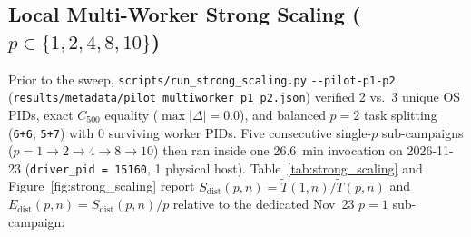 \documentclass[11pt,a4paper]{article}
\begin{document}
\subsection{Local Multi-Worker Strong Scaling (\texorpdfstring{$p \in \{1, 2, 4, 8, 10\}$}{p in {1, 2, 4, 8, 10}})}
Prior to the sweep, \nolinkurl{scripts/run_strong_scaling.py} \texttt{-{}-pilot-p1-p2} (\nolinkurl{results/metadata/pilot_multiworker_p1_p2.json}) verified 2 vs.\ 3 unique OS PIDs, exact $C_{500}$ equality ($\max|\Delta|=0.0$), and balanced $p=2$ task splitting (\texttt{6+6}, \texttt{5+7}) with 0 surviving worker PIDs. Five consecutive single-$p$ sub-campaigns ($p = 1 \to 2 \to 4 \to 8 \to 10$) then ran inside one \SI{26.6}{\minute} invocation on 2026-11-23 (\texttt{driver\_pid = 15160}, 1 physical host). Table~\ref{tab:strong_scaling} and Figure~\ref{fig:strong_scaling} report $S_{\text{dist}}(p, n) = \tilde{T}(1, n)/\tilde{T}(p, n)$ and $E_{\text{dist}}(p, n) = S_{\text{dist}}(p, n)/p$ relative to the dedicated Nov~23 $p=1$ sub-campaign:
\end{document}
